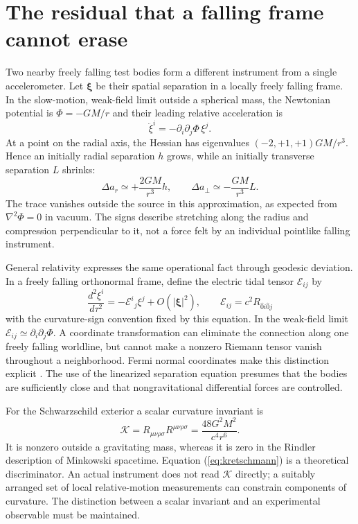 \documentclass[11pt,letterpaper]{article}
\begin{document}
\section{The residual that a falling frame cannot erase}

Two nearby freely falling test bodies form a different instrument from a single accelerometer. Let $\bm{\xi}$ be their spatial separation in a locally freely falling frame. In the slow-motion, weak-field limit outside a spherical mass, the Newtonian potential is $\Phi=-GM/r$ and their leading relative acceleration is
\begin{equation}
 \ddot\xi^i=-\partial_i\partial_j\Phi\,\xi^j.
 \label{eq:tidalnewton}
\end{equation}
At a point on the radial axis, the Hessian has eigenvalues $(-2,+1,+1)GM/r^3$. Hence an initially radial separation $h$ grows, while an initially transverse separation $L$ shrinks:
\begin{equation}
 \Delta a_{r}\simeq +\frac{2GM}{r^3}h,
 \qquad
 \Delta a_{\perp}\simeq-\frac{GM}{r^3}L.
 \label{eq:tidalcomponents}
\end{equation}
The trace vanishes outside the source in this approximation, as expected from $\nabla^2\Phi=0$ in vacuum. The signs describe stretching along the radius and compression perpendicular to it, not a force felt by an individual pointlike falling instrument.

General relativity expresses the same operational fact through geodesic deviation. In a freely falling orthonormal frame, define the electric tidal tensor $\mathcal E_{ij}$ by
\begin{equation}
 \frac{d^2\xi^i}{d\tau^2}=-\mathcal E^{i}{}_{j}\xi^j+O(|\bm\xi|^2),
 \qquad \mathcal E_{ij}=c^2 R_{\hat 0 i\hat 0 j}
 \label{eq:deviation}
\end{equation}
with the curvature-sign convention fixed by this equation. In the weak-field limit $\mathcal E_{ij}\simeq\partial_i\partial_j\Phi$. A coordinate transformation can eliminate the connection along one freely falling worldline, but cannot make a nonzero Riemann tensor vanish throughout a neighborhood. Fermi normal coordinates make this distinction explicit \cite{Nesterov}. The use of the linearized separation equation presumes that the bodies are sufficiently close and that nongravitational differential forces are controlled.

For the Schwarzschild exterior a scalar curvature invariant is
\begin{equation}
 \mathcal K=R_{\mu\nu\rho\sigma}R^{\mu\nu\rho\sigma}
 =\frac{48G^2M^2}{c^4r^6}.
 \label{eq:kretschmann}
\end{equation}
It is nonzero outside a gravitating mass, whereas it is zero in the Rindler description of Minkowski spacetime. Equation (\ref{eq:kretschmann}) is a theoretical discriminator. An actual instrument does not read $\mathcal K$ directly; a suitably arranged set of local relative-motion measurements can constrain components of curvature. The distinction between a scalar invariant and an experimental observable must be maintained.
\end{document}

